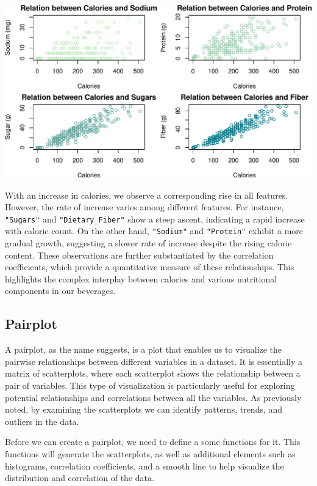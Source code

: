 \documentclass[
]{article}
\begin{document}
\begin{center}\includegraphics{Statistical_Learning_Final_Report_files/figure-latex/scatterplot-1} \end{center}

With an increase in calories, we observe a corresponding rise in all
features. However, the rate of increase varies among different features.
For instance, \texttt{"Sugars"} and \texttt{"Dietary\_Fiber"} show a
steep ascent, indicating a rapid increase with calorie count. On the
other hand, \texttt{"Sodium"} and \texttt{"Protein"} exhibit a more
gradual growth, suggesting a slower rate of increase despite the rising
calorie content. These observations are further substantiated by the
correlation coefficients, which provide a quantitative measure of these
relationships. This highlights the complex interplay between calories
and various nutritional components in our beverages.

\subsection{Pairplot}\label{pairplot}

A pairplot, as the name suggests, is a plot that enables us to visualize
the pairwise relationships between different variables in a dataset. It
is essentially a matrix of scatterplots, where each scatterplot shows
the relationship between a pair of variables. This type of visualization
is particularly useful for exploring potential relationships and
correlations between all the variables. As previously noted, by
examining the scatterplots we can identify patterns, trends, and
outliers in the data.

Before we can create a pairplot, we need to define a some functions for
it. This functions will generate the scatterplots, as well as additional
elements such as histograms, correlation coefficients, and a smooth line
to help visualize the distribution and correlation of the data.
\end{document}
